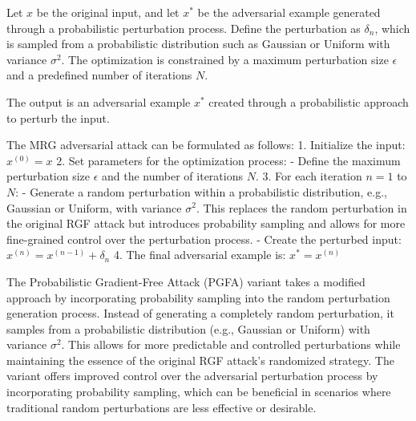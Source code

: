 Let \( x \) be the original input, and let \( x^* \) be the adversarial example generated through a probabilistic perturbation process. Define the perturbation as \( \delta_n \), which is sampled from a probabilistic distribution such as Gaussian or Uniform with variance \( \sigma^2 \). The optimization is constrained by a maximum perturbation size \( \epsilon \) and a predefined number of iterations \( N \).


The output is an adversarial example $x^*$ created through a probabilistic approach to perturb the input.

The MRG adversarial attack can be formulated as follows:
1. Initialize the input:
$x^{(0)} = x$
2. Set parameters for the optimization process:
   - Define the maximum perturbation size $\epsilon$ and the number of iterations $N$.
3. For each iteration $n = 1$ to $N$:
   - Generate a random perturbation within a probabilistic distribution, e.g., Gaussian or Uniform, with variance $\sigma^2$. This replaces the random perturbation in the original RGF attack but introduces probability sampling and allows for more fine-grained control over the perturbation process.
   - Create the perturbed input:
   $x^{(n)} = x^{(n-1)} + \delta_n$
4. The final adversarial example is:
$x^* = x^{(n)}$

The Probabilistic Gradient-Free Attack (PGFA) variant takes a modified approach by incorporating probability sampling into the random perturbation generation process. Instead of generating a completely random perturbation, it samples from a probabilistic distribution (e.g., Gaussian or Uniform) with variance $\sigma^2$. This allows for more predictable and controlled perturbations while maintaining the essence of the original RGF attack's randomized strategy. The variant offers improved control over the adversarial perturbation process by incorporating probability sampling, which can be beneficial in scenarios where traditional random perturbations are less effective or desirable.